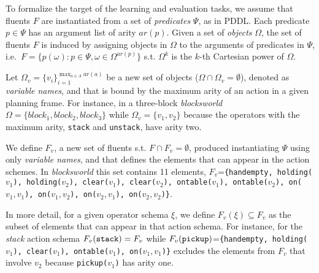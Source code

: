 \documentclass[letterpaper]{article} %
\begin{document}
To formalize the target of the learning and evaluation tasks, we assume that fluents $F$ are instantiated from a set of {\em predicates} $\Psi$, as in PDDL. Each predicate $p\in\Psi$ has an argument list of arity $ar(p)$. Given a set of {\em objects} $\Omega$, the set of fluents $F$ is induced by assigning objects in $\Omega$ to the arguments of predicates in $\Psi$, i.e.~$F=\{p(\omega):p\in\Psi,\omega\in\Omega^{ar(p)}\}$ s.t. $\Omega^k$ is the $k$-th Cartesian power of $\Omega$.

Let $\Omega_v=\{v_i\}_{i=1}^{\operatorname*{max}_{a\in A} ar(a)}$ be a new set of objects ($\Omega\cap\Omega_v=\emptyset$), denoted as {\em variable names}, and that is bound by the maximum arity of an action in a given planning frame. For instance, in a three-block {\em blocksworld} $\Omega=\{block_1, block_2, block_3\}$ while $\Omega_v=\{v_1, v_2\}$ because the operators with the maximum arity, {\small\tt stack} and {\small\tt unstack}, have arity two.

We define $F_v$, a new set of fluents s.t. $F\cap F_v=\emptyset$, produced instantiating $\Psi$ using only {\em variable names}, and that defines the elements that can appear in the action schemes. In {\em blocksworld} this set contains 11 elements, $F_v$={\small\tt\{handempty, holding($v_1$), holding($v_2$), clear($v_1$), clear($v_2$), ontable($v_1$), ontable($v_2$), on($v_1,v_1$), on($v_1,v_2$), on($v_2,v_1$), on($v_2,v_2$)\}}.

In more detail, for a given operator schema $\xi$, we define $F_v(\xi)\subseteq F_v$ as the subset of elements that can appear in that action schema. For instance, for the {\em stack} action schema $F_v({\tt stack})=F_v$ while $F_v({\tt pickup})$={\small\tt\{handempty, holding($v_1$), clear($v_1$), ontable($v_1$), on($v_1,v_1$)\}} excludes the elements from $F_v$ that involve $v_2$ because {\small\tt pickup($v_1$)} has arity one.
\end{document}
